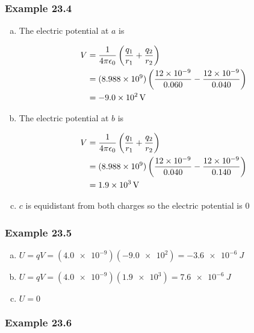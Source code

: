 \documentclass{article}
\begin{document}
\subsubsection{Example 23.4}

\begin{enumerate}[a)]
  \item The electric potential at $a$ is

        \begin{align*}
          V & = \frac{1}{4 \pi \epsilon_0} \left( \frac{q_1}{r_1} + \frac{q_2}{r_2} \right)                                 \\
            & = (\num{8.988e9}) \left( \frac{\num{12e-9}}{0.060} - \frac{\num{12e-9}}{0.040} \right) \\
            & = \qty{-9.0e2}{V}
        \end{align*}

  \item The electric potential at $b$ is

        \begin{align*}
          V & = \frac{1}{4 \pi \epsilon_0} \left( \frac{q_1}{r_1} + \frac{q_2}{r_2} \right)                                 \\
            & = (\num{8.988e9}) \left( \frac{\num{12e-9}}{0.040} - \frac{\num{12e-9}}{0.140} \right) \\
            & = \qty{1.9e3}{V}
        \end{align*}

  \item $c$ is equidistant from both charges so the electric potential is $0$
\end{enumerate}

\subsubsection{Example 23.5}

\begin{enumerate}[a)]
  \item $U = qV = (\num{4.0e-9})(\num{-9.0e2}) = \qty{-3.6e-6}{J}$

  \item $U = qV = (\num{4.0e-9})(\num{1.9e3}) = \qty{7.6e-6}{J}$

  \item $U = 0$
\end{enumerate}

\subsubsection{Example 23.6}
\end{document}
